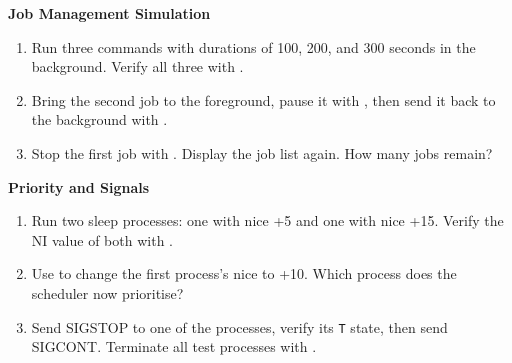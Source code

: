 \begin{exercisebox}[5.B]
  \textbf{Job Management Simulation}
  \begin{enumerate}
    \item Run three  commands with durations of 100, 200, and 300
      seconds in the background. Verify all three with .
    \item Bring the second job to the foreground, pause it with
      , then send it back to the background with .
    \item Stop the first job with . Display the job list again.
      How many jobs remain?
  \end{enumerate}
\end{exercisebox}

\begin{exercisebox}[5.C]
  \textbf{Priority and Signals}
  \begin{enumerate}
    \item Run two sleep processes: one with nice +5 and one with nice +15.
      Verify the NI value of both with .
    \item Use  to change the first process's nice to +10. Which
      process does the scheduler now prioritise?
    \item Send SIGSTOP to one of the processes, verify its \texttt{T} state,
      then send SIGCONT. Terminate all test processes with .
  \end{enumerate}
\end{exercisebox}

%

